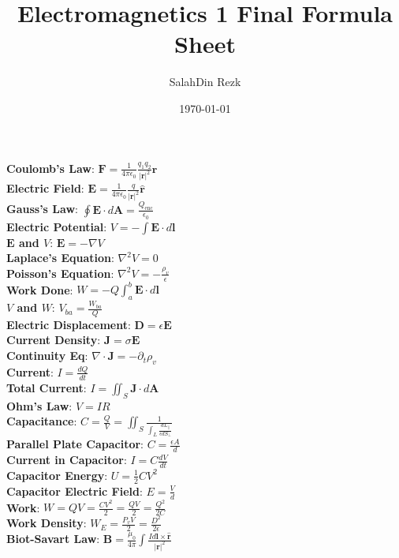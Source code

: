 \documentclass[12pt]{article}
\title{Electromagnetics 1 Final Formula Sheet}
\author{SalahDin Rezk}
\date{\today}
\begin{document}
\begin{multicols}{3}
  \textbf{Coulomb's Law}: $\mathbf{F} = \frac{1}{4 \pi \epsilon_0} \frac{q_1 q_2}{|\mathbf{r}|^2} \hat{\mathbf{r}}$ \\
  \textbf{Electric Field}: $\mathbf{E} = \frac{1}{4 \pi \epsilon_0} \frac{q}{|\mathbf{r}|^2} \hat{\mathbf{r}}$ \\
  \textbf{Gauss's Law}: $\oint \mathbf{E} \cdot d\mathbf{A} = \frac{Q_{\text{enc}}}{\epsilon_0}$ \\
  \textbf{Electric Potential}: $V = - \int \mathbf{E} \cdot d\mathbf{l}$ \\
  \textbf{$\mathbf{E}$ and $V$}: $\mathbf{E} = -\nabla V$ \\
  \textbf{Laplace's Equation}: $\nabla^2 V = 0$ \\
  \textbf{Poisson's Equation}: $\nabla^2 V = -\frac{\rho_v}{\epsilon}$ \\
  \textbf{Work Done}: $W=-Q\int_{a}^{b} \mathbf{E} \cdot d\mathbf{l}$\\
  \textbf{$V$ and $W$}: $V_{ba}=\frac{W_{ba}}{Q}$\\
  \textbf{Electric Displacement}: $\mathbf{D} = \epsilon\mathbf{E}$ \\
  \textbf{Current Density}: $\mathbf{J} = \sigma \mathbf{E}$ \\
  \textbf{Continuity Eq}: $\nabla \cdot \mathbf{J} = -\partial_{t} \rho_v$ \\
  \textbf{Current}: $I = \frac{dQ}{dt}$ \\
  \textbf{Total Current}: $I = \iint_S \mathbf{J} \cdot d\mathbf{A}$ \\
  \textbf{Ohm's Law}: $V = IR$ \\
  \textbf{Capacitance}: $C = \frac{Q}{V} = \iint_S \frac{1}{\int_L \frac{dL_{\parallel}}{\epsilon dS_{\perp}}}$ \\
  \textbf{Parallel Plate Capacitor}: $C = \frac{\epsilon A}{d}$ \\
  \textbf{Current in Capacitor}: $I = C \frac{dV}{dt}$ \\
  \textbf{Capacitor Energy}: $U = \frac{1}{2} C V^2$ \\
  \textbf{Capacitor Electric Field}: $E = \frac{V}{d}$ \\
  \textbf{Work}: $W=QV=\frac{CV^2}{2}=\frac{QV}{2}=\frac{Q^2}{2C}$\\
  \textbf{Work Density}: $W_E=\frac{P_{v}V}{2}=\frac{D^2}{2\epsilon}$\\
  \textbf{Biot-Savart Law}: $\mathbf{B} = \frac{\mu_0}{4 \pi} \int \frac{I d\mathbf{l} \times \hat{\mathbf{r}}}{|\mathbf{r}|^2}$ \\

\end{multicols}
\end{document}
